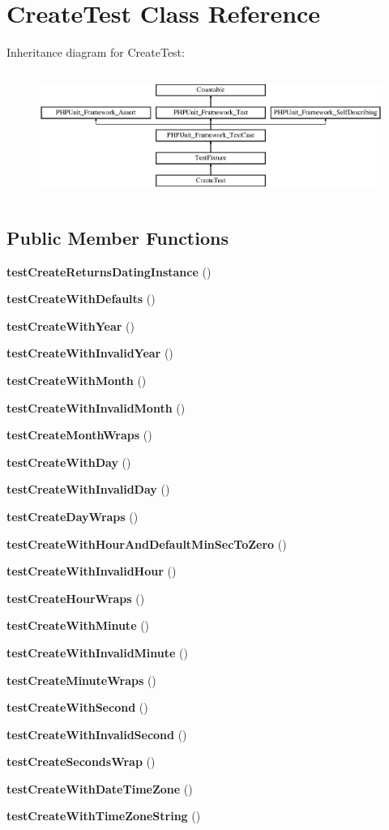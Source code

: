 \section{Create\+Test Class Reference}
\label{class_create_test}
Inheritance diagram for Create\+Test\+:\begin{figure}[H]
\begin{center}
\leavevmode
\includegraphics[height=4.129793cm]{class_create_test}
\end{center}
\end{figure}
\subsection*{Public Member Functions}
\begin{DoxyCompactItemize}
\item 
{\bf test\+Create\+Returns\+Dating\+Instance} ()
\item 
{\bf test\+Create\+With\+Defaults} ()
\item 
{\bf test\+Create\+With\+Year} ()
\item 
{\bf test\+Create\+With\+Invalid\+Year} ()
\item 
{\bf test\+Create\+With\+Month} ()
\item 
{\bf test\+Create\+With\+Invalid\+Month} ()
\item 
{\bf test\+Create\+Month\+Wraps} ()
\item 
{\bf test\+Create\+With\+Day} ()
\item 
{\bf test\+Create\+With\+Invalid\+Day} ()
\item 
{\bf test\+Create\+Day\+Wraps} ()
\item 
{\bf test\+Create\+With\+Hour\+And\+Default\+Min\+Sec\+To\+Zero} ()
\item 
{\bf test\+Create\+With\+Invalid\+Hour} ()
\item 
{\bf test\+Create\+Hour\+Wraps} ()
\item 
{\bf test\+Create\+With\+Minute} ()
\item 
{\bf test\+Create\+With\+Invalid\+Minute} ()
\item 
{\bf test\+Create\+Minute\+Wraps} ()
\item 
{\bf test\+Create\+With\+Second} ()
\item 
{\bf test\+Create\+With\+Invalid\+Second} ()
\item 
{\bf test\+Create\+Seconds\+Wrap} ()
\item 
{\bf test\+Create\+With\+Date\+Time\+Zone} ()
\item 
{\bf test\+Create\+With\+Time\+Zone\+String} ()
\end{DoxyCompactItemize}
